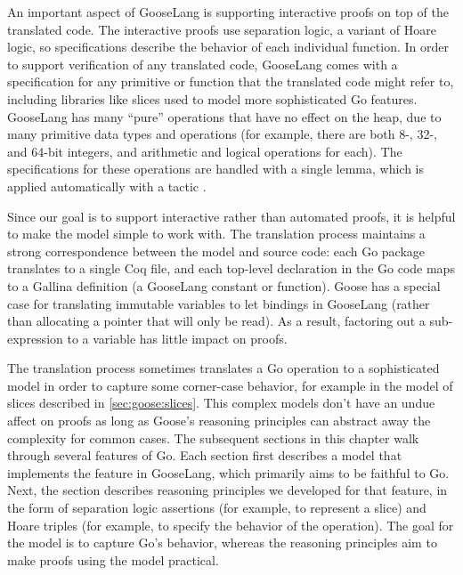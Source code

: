 An important aspect of GooseLang is supporting interactive proofs on top
of the translated code. The interactive proofs use separation logic, a
variant of Hoare logic, so specifications describe the behavior of each
individual function. In order to support verification of any translated
code, GooseLang comes with a specification for any primitive or function
that the translated code might refer to, including libraries like slices
used to model more sophisticated Go features. GooseLang has many
``pure'' operations that have no effect on the heap, due to many
primitive data types and operations (for example, there are both 8-,
32-, and 64-bit integers, and arithmetic and logical operations for
each). The specifications for these operations are handled with a single
lemma, which is applied automatically with a tactic .

Since our goal is to support interactive rather than automated proofs,
it is helpful to make the model simple to work with. The translation process maintains
a strong correspondence between the model and source code: each Go
package translates to a single Coq file, and each top-level declaration
in the Go code maps to a Gallina definition (a GooseLang constant or
function). Goose has a special case for translating immutable variables
to let bindings in GooseLang (rather than allocating a pointer that will
only be read). As a result, factoring out a sub-expression to a variable
has little impact on proofs.

The translation process sometimes translates a Go operation to a sophisticated
model in order to capture some corner-case behavior, for example in the model of
slices described in \cref{sec:goose:slices}. This complex models don't have an
undue affect on proofs as long as Goose's reasoning principles can abstract away
the complexity for common cases. The subsequent sections in this chapter
walk through several features of Go. Each section first describes a model that
implements the feature in GooseLang, which primarily aims to
be faithful to Go. Next, the section describes reasoning principles we developed for that
feature, in the form of separation logic assertions (for example, to
represent a slice) and Hoare triples (for example, to specify the
behavior of the  operation). The goal for the model is to capture
Go's behavior, whereas the reasoning
principles aim to make proofs using the model practical.
